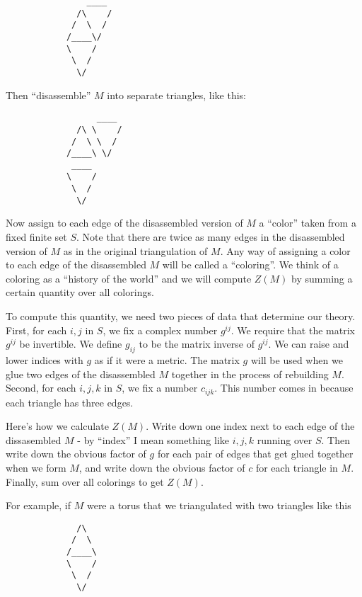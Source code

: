 \documentclass{article}
\begin{document}
\begin{verbatim}
                ____
              /\    /
             /  \  /
            /____\/ 
            \    /   
             \  /          
              \/     
\end{verbatim}

Then ``disassemble'' \(M\) into separate triangles, like this:

\begin{verbatim}
                  ____
              /\ \    /
             /  \ \  /
            /____\ \/
             ____ 
            \    /   
             \  /          
              \/     
\end{verbatim}

Now assign to each edge of the disassembled version of \(M\) a ``color''
taken from a fixed finite set \(S\). Note that there are twice as many
edges in the disassembled version of \(M\) as in the original
triangulation of \(M\). Any way of assigning a color to each edge of the
disassembled \(M\) will be called a ``coloring''. We think of a coloring
as a ``history of the world'' and we will compute \(Z(M)\) by summing a
certain quantity over all colorings.

To compute this quantity, we need two pieces of data that determine our
theory. First, for each \(i,j\) in \(S\), we fix a complex number
\(g^{ij}\). We require that the matrix \(g^{ij}\) be invertible. We
define \(g_{ij}\) to be the matrix inverse of \(g^{ij}\). We can raise
and lower indices with \(g\) as if it were a metric. The matrix \(g\)
will be used when we glue two edges of the disassembled \(M\) together
in the process of rebuilding \(M\). Second, for each \(i,j,k\) in \(S\),
we fix a number \(c_{ijk}\). This number comes in because each triangle
has three edges.

Here's how we calculate \(Z(M)\). Write down one index next to each edge
of the dissasembled \(M\) - by ``index'' I mean something like \(i,j,k\)
running over \(S\). Then write down the obvious factor of \(g\) for each
pair of edges that get glued together when we form \(M\), and write down
the obvious factor of \(c\) for each triangle in \(M\). Finally, sum
over all colorings to get \(Z(M)\).

For example, if \(M\) were a torus that we triangulated with two
triangles like this

\begin{verbatim}
              /\
             /  \
            /____\
            \    /   
             \  /          
              \/     
\end{verbatim}
\end{document}

